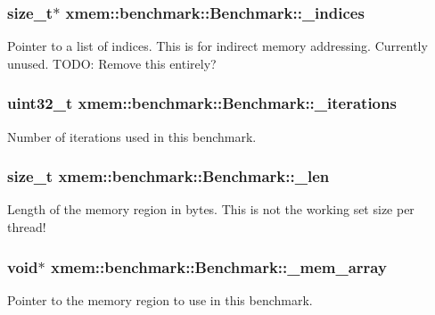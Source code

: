 \subsubsection[{\+\_\+indices}]{\setlength{\rightskip}{0pt plus 5cm}size\+\_\+t$\ast$ xmem\+::benchmark\+::\+Benchmark\+::\+\_\+indices\hspace{0.3cm}{\ttfamily [protected]}}\label{classxmem_1_1benchmark_1_1_benchmark_a1001cb321d8d655a71d435f5a06fdd3a}
Pointer to a list of indices. This is for indirect memory addressing. Currently unused. T\+O\+D\+O\+: Remove this entirely? \hypertarget{classxmem_1_1benchmark_1_1_benchmark_a968403a473a3a4f713f4e73aa0757727}{}
\subsubsection[{\+\_\+iterations}]{\setlength{\rightskip}{0pt plus 5cm}uint32\+\_\+t xmem\+::benchmark\+::\+Benchmark\+::\+\_\+iterations\hspace{0.3cm}{\ttfamily [protected]}}\label{classxmem_1_1benchmark_1_1_benchmark_a968403a473a3a4f713f4e73aa0757727}
Number of iterations used in this benchmark. \hypertarget{classxmem_1_1benchmark_1_1_benchmark_ae97857f36cabdbe76eb00142835f7881}{}
\subsubsection[{\+\_\+len}]{\setlength{\rightskip}{0pt plus 5cm}size\+\_\+t xmem\+::benchmark\+::\+Benchmark\+::\+\_\+len\hspace{0.3cm}{\ttfamily [protected]}}\label{classxmem_1_1benchmark_1_1_benchmark_ae97857f36cabdbe76eb00142835f7881}
Length of the memory region in bytes. This is not the working set size per thread! \hypertarget{classxmem_1_1benchmark_1_1_benchmark_a134705051be06902b276f5c21d435ed0}{}
\subsubsection[{\+\_\+mem\+\_\+array}]{\setlength{\rightskip}{0pt plus 5cm}void$\ast$ xmem\+::benchmark\+::\+Benchmark\+::\+\_\+mem\+\_\+array\hspace{0.3cm}{\ttfamily [protected]}}\label{classxmem_1_1benchmark_1_1_benchmark_a134705051be06902b276f5c21d435ed0}
Pointer to the memory region to use in this benchmark. \hypertarget{classxmem_1_1benchmark_1_1_benchmark_a8489553bc6539a9b19db72e9f6ca9a9e}{}
